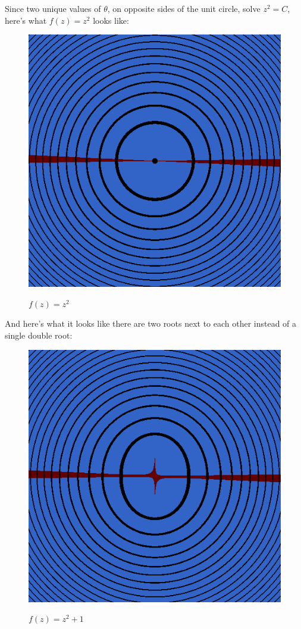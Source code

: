 \documentclass[xhtml, mathjax]{article}
\begin{document}
    Since two unique values of $\theta$, on opposite sides of the unit circle,
    solve $z^2 = C$, here's what $f(z) = z^2$ looks like:

    \begin{figure}
      \centering
      \includegraphics{poly_1.gif}\par
      $f(z) = z^2$
    \end{figure}

    And here's what it looks like there are two roots next to each other instead
    of a single double root:

    \begin{figure}
      \centering
      \includegraphics{poly_2.gif}\par
      $f(z) = z^2 + 1$
    \end{figure}
\end{document}
